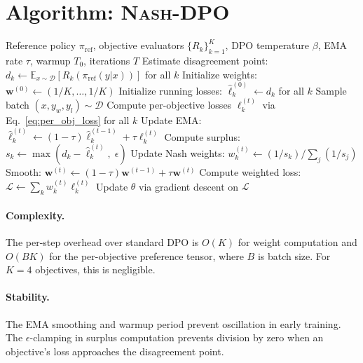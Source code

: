 \documentclass{article}
\newcommand{\piref}{\pi_{\text{ref}}}
\newcommand{\EE}{\mathbb{E}}
\newcommand{\NashDPO}{\textsc{Nash-DPO}}
\begin{document}
\section{Algorithm: \NashDPO{}}
\label{sec:algorithm}

\begin{algorithm}[t]
\caption{\NashDPO{}: Multi-Objective Alignment via Nash Bargaining}
\label{alg:nash_dpo}
\begin{algorithmic}[1]
\REQUIRE Reference policy $\piref$, objective evaluators $\{R_k\}_{k=1}^K$, DPO temperature $\beta$, EMA rate $\tau$, warmup $T_0$, iterations $T$
\STATE Estimate disagreement point: $d_k \leftarrow \EE_{x \sim \mathcal{D}}[R_k(\piref(y|x))]$ for all $k$
\STATE Initialize weights: $\mathbf{w}^{(0)} \leftarrow (1/K, \ldots, 1/K)$
\STATE Initialize running losses: $\hat{\ell}_k^{(0)} \leftarrow d_k$ for all $k$
    \STATE Sample batch $(x, y_w, y_l) \sim \mathcal{D}$
    \STATE Compute per-objective losses $\ell_k^{(t)}$ via Eq.~\eqref{eq:per_obj_loss} for all $k$
    \STATE Update EMA: $\hat{\ell}_k^{(t)} \leftarrow (1-\tau)\hat{\ell}_k^{(t-1)} + \tau \ell_k^{(t)}$
        \STATE Compute surplus: $s_k \leftarrow \max(d_k - \hat{\ell}_k^{(t)},\; \epsilon)$
        \STATE Update Nash weights: $w_k^{(t)} \leftarrow (1/s_k) / \sum_j (1/s_j)$
        \STATE Smooth: $\mathbf{w}^{(t)} \leftarrow (1-\tau)\mathbf{w}^{(t-1)} + \tau \mathbf{w}^{(t)}$
    \ENDIF
    \STATE Compute weighted loss: $\mathcal{L} \leftarrow \sum_k w_k^{(t)} \ell_k^{(t)}$
    \STATE Update $\theta$ via gradient descent on $\mathcal{L}$
\ENDFOR
\end{algorithmic}
\end{algorithm}

\paragraph{Complexity.}
The per-step overhead over standard DPO is $O(K)$ for weight computation and $O(BK)$ for the per-objective preference tensor, where $B$ is batch size.
For $K=4$ objectives, this is negligible.

\paragraph{Stability.}
The EMA smoothing and warmup period prevent oscillation in early training.
The $\epsilon$-clamping in surplus computation prevents division by zero when an objective's loss approaches the disagreement point.
\end{document}
